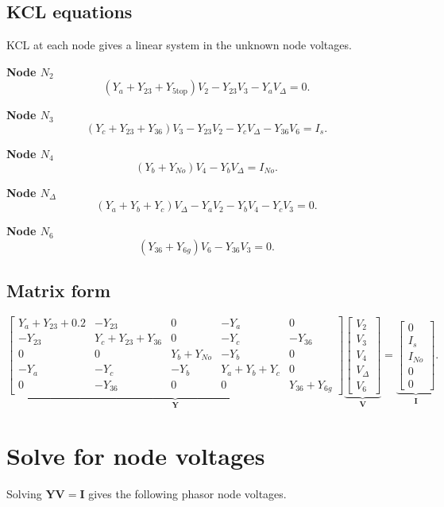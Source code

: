 \documentclass{article}
\begin{document}
\subsection*{KCL equations}
KCL at each node gives a linear system in the unknown node voltages.

\noindent\textbf{Node $N_2$}
\[
(Y_{a}+Y_{23}+Y_{5\text{top}})V_2 - Y_{23}V_3 - Y_{a}V_{\Delta} = 0.
\]

\noindent\textbf{Node $N_3$}
\[
(Y_{c}+Y_{23}+Y_{36})V_3 - Y_{23}V_2 - Y_{c}V_{\Delta} - Y_{36}V_6 = I_s.
\]

\noindent\textbf{Node $N_4$}
\[
(Y_{b}+Y_{No})V_4 - Y_{b}V_{\Delta} = I_{No}.
\]

\noindent\textbf{Node $N_{\Delta}$}
\[
(Y_{a}+Y_{b}+Y_{c})V_{\Delta} - Y_{a}V_2 - Y_{b}V_4 - Y_{c}V_3 = 0.
\]

\noindent\textbf{Node $N_6$}
\[
(Y_{36}+Y_{6g})V_6 - Y_{36}V_3 = 0.
\]

\subsection*{Matrix form}
\[
\underbrace{\begin{bmatrix}
Y_a+Y_{23}+0.2 & -Y_{23} & 0 & -Y_a & 0\\
-Y_{23} & Y_c+Y_{23}+Y_{36} & 0 & -Y_c & -Y_{36}\\
0 & 0 & Y_b+Y_{No} & -Y_b & 0\\
-Y_a & -Y_c & -Y_b & Y_a+Y_b+Y_c & 0\\
0 & -Y_{36} & 0 & 0 & Y_{36}+Y_{6g}
\end{bmatrix}}_{\mathbf{Y}}
\!\!
\underbrace{\begin{bmatrix}
V_2\\ V_3\\ V_4\\ V_{\Delta}\\ V_6
\end{bmatrix}}_{\mathbf{V}}
=
\underbrace{\begin{bmatrix}
0\\ I_s\\ I_{No}\\ 0\\ 0
\end{bmatrix}}_{\mathbf{I}}.
\]

\section*{Solve for node voltages}
Solving $\mathbf{Y}\mathbf{V}=\mathbf{I}$ gives the following phasor node voltages.
\end{document}
